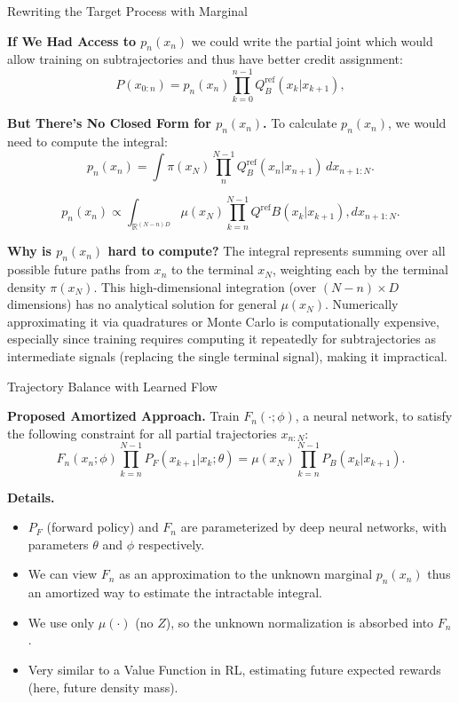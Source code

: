 \documentclass[aspectratio=169,xcolor=dvipsnames]{beamer}
\begin{document}
\begin{frame}[t]{Rewriting the Target Process with Marginal}
\scriptsize

\textbf{If We Had Access to $p_n(x_n)$} we could write the partial joint which would allow training on subtrajectories and thus have better credit assignment:
\[
P(x_{0:n}) = p_n(x_n) \prod_{k=0}^{n-1} Q^\text{ref}_B(x_k | x_{k+1}),
\]

\textbf{But There's No Closed Form for $p_n(x_n)$.} To calculate $p_n(x_n)$, we would need to compute the integral:
\[
p_n(x_n) = \int \pi(x_N) \prod_{n}^{N-1} Q^\text{ref}_B(x_n | x_{n+1}) \, dx_{n+1:N}.
\]

\[
p_n(x_n) \propto \int_{\mathbb{R}^{(N-n)D}} \mu(x_N) \prod_{k=n}^{N-1} Q^{\text{ref}}B(x_k | x_{k+1}) , dx_{n+1:N}.
\]

\textbf{Why is $p_n(x_n)$ hard to compute?} The integral represents summing over all possible future paths from $x_n$ to the terminal $x_N$, weighting each by the terminal density $\pi(x_N)$. This high-dimensional integration (over $(N-n)\times D$ dimensions) has no analytical solution for general $\mu(x_N)$. Numerically approximating it via quadratures or Monte Carlo is computationally expensive, especially since training requires computing it repeatedly for subtrajectories as intermediate signals (replacing the single terminal signal), making it impractical.


\end{frame}

\begin{frame}[t]{Trajectory Balance with Learned Flow}
\footnotesize

\textbf{Proposed Amortized Approach.} Train $F_n(\cdot; \phi)$, a neural network, to satisfy the following constraint for all partial trajectories $x_{n:N}$:
\[
F_n(x_n; \phi) \prod_{k=n}^{N-1} P_F(x_{k+1} | x_k; \theta) = \mu(x_N) \prod_{k=n}^{N-1} P_B(x_k | x_{k+1}).
\]

\textbf{Details.}
\begin{itemize}\itemsep2pt
  \item $P_F$ (forward policy) and $F_n$ are parameterized by deep neural networks, with parameters $\theta$ and $\phi$ respectively.
  \item We can view $F_n$ as an approximation to the unknown marginal $p_n(x_n)$ thus an amortized way to estimate the intractable integral.
  \item We use only $\mu(\cdot)$ (no $Z$), so the unknown normalization is absorbed into $F_n$.
  \item Very similar to a Value Function in RL, estimating future expected rewards (here, future density mass).
\end{itemize}
\end{frame}
\end{document}
